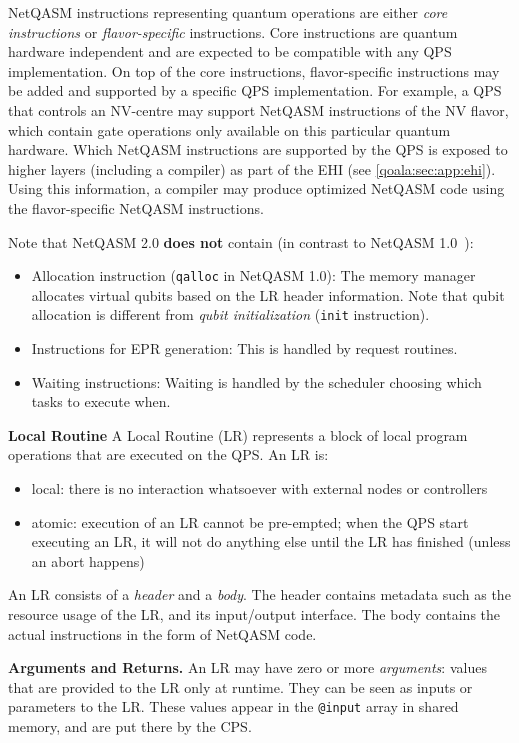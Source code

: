 NetQASM instructions representing quantum operations are either \textit{core instructions} or \textit{flavor-specific} instructions.
Core instructions are quantum hardware independent and are expected to be compatible with any QPS implementation. On top of the core instructions, flavor-specific instructions may be added and supported by a specific QPS implementation. For example, a QPS that controls an NV-centre may support NetQASM instructions of the NV flavor, which contain gate operations only available on this particular quantum hardware. Which NetQASM instructions are supported by the QPS is exposed to higher layers (including a compiler) as part of the EHI (see \cref{qoala:sec:app:ehi}). Using this information, a compiler may produce optimized NetQASM code using the flavor-specific NetQASM instructions.


Note that NetQASM 2.0 \textbf{does not} contain (in contrast to NetQASM 1.0~\cite{dahlberg2022netqasm}):
\begin{itemize}
\item Allocation instruction (\texttt{qalloc} in NetQASM 1.0): The memory manager allocates virtual qubits based on the LR header information. Note that qubit allocation is different from \textit{qubit initialization} (\texttt{init} instruction).
\item Instructions for EPR generation: This is handled by request routines.
\item Waiting instructions: Waiting is handled by the scheduler choosing which tasks to execute when.
\end{itemize}

\textbf{Local Routine}
A Local Routine (LR) represents a block of local program operations that are executed on the QPS. An LR is:
\begin{itemize}
\item local: there is no interaction whatsoever with external nodes or controllers
\item atomic: execution of an LR cannot be pre-empted; when the QPS start executing an LR, it will not do anything else until the LR has finished (unless an abort happens)
\end{itemize}

An LR consists of a \textit{header} and a \textit{body}. The header contains metadata such as the resource usage of the LR, and its input/output interface. The body contains the actual instructions in the form of NetQASM code.


\textbf{Arguments and Returns.}
An LR may have zero or more \textit{arguments}: values that are provided to the LR only at runtime.
They can be seen as inputs or parameters to the LR.
These values appear in the \texttt{@input} array in shared memory, and are put there by the CPS.

